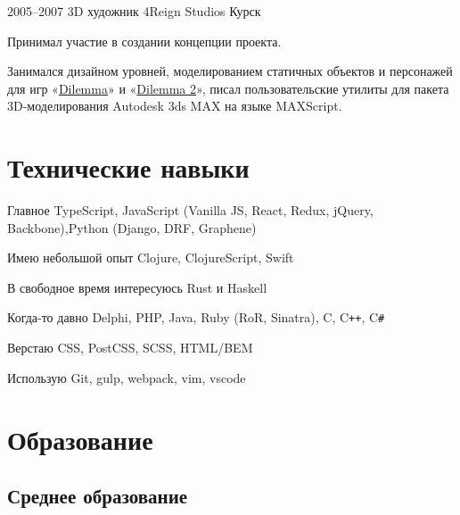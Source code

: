 \documentclass[11pt,a4paper,sans]{moderncv}
\newcommand{\lang}[2]{#1}
\begin{document}
{\cventry
    {2005--2007}
    {\lang
        {3D художник}
        {3D Artist}}
    {4Reign Studios}
    {\lang
        {Курск}
        {Kursk}}
    {}
    {}

\cvlistitem
    {\lang
        {Принимал участие в создании концепции проекта.}
        {TODO}}

\cvlistitem
    {\lang
        {Занимался дизайном уровней, моделированием статичных объектов и персонажей для игр «\href{https://www.igromania.ru/game/3494/Dilemma.html}{Dilemma}» и «\href{https://www.igromania.ru/game/3959/Dilemma_2.html}{Dilemma 2}», писал пользовательские утилиты для пакета 3D-моделирования Autodesk 3ds MAX на языке MAXScript.}
        {TODO}\newline}


\section
    {\lang
        {Технические навыки}
        {Technical Skills}}

\cvline
    {\lang
        {Главное}
        {Main}}
    {TypeScript, JavaScript (Vanilla JS, React, Redux, jQuery, Backbone),\newline Python (Django, DRF, Graphene)}

\cvline
{\lang
    {Имею небольшой опыт}
    {Have some experience}}
{Clojure, ClojureScript, Swift}

\cvline
    {\lang
        {В свободное время}
        {TODO}}
    {\lang
        {интересуюсь Rust и Haskell}
        {Have an interest in Rust and Haskell}}

\cvline
    {\lang
        {Когда-то давно}
        {TODO}}
    {Delphi, PHP, Java, Ruby (RoR, Sinatra), C, C\texttt{++}, C\texttt{\#}}

\cvline
    {\lang
        {Верстаю}
        {TODO}}
    {CSS, PostCSS, SCSS, HTML/BEM}

\cvline
    {\lang
        {Использую}
        {TODO}}
    {Git, gulp, webpack, vim, vscode}


\section
    {\lang
        {Образование}
        {Education}}


\subsection
    {\lang
        {Среднее образование}
        {Secondary school }}

}
\end{document}
